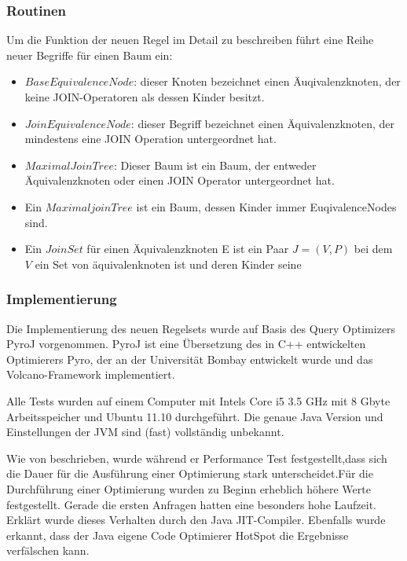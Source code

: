 \subsubsection{Routinen}











Um die Funktion der neuen Regel im Detail zu beschreiben führt \cite{shanbhag2014optimizing} eine Reihe neuer Begriffe für einen Baum ein:

\begin{itemize}
\item $Base Equivalence Node$: dieser Knoten bezeichnet einen Äuqivalenzknoten, der keine JOIN-Operatoren als dessen Kinder besitzt.
\item $Join Equivalence Node$: dieser Begriff bezeichnet einen Äquivalenzknoten, der mindestens eine JOIN Operation untergeordnet hat.
\item $Maximal Join Tree$: Dieser Baum ist ein Baum, der entweder Äquivalenzknoten oder einen JOIN Operator untergeordnet hat.
\item Ein $Maximal join Tree$ ist ein Baum, dessen Kinder immer EuqivalenceNodes sind.
\item Ein $Join Set$ für einen Äquivalenzknoten E ist ein Paar $J = (V, P)$ bei dem $V$ ein Set von äquivalenknoten ist und deren Kinder seine 
\end{itemize}


\subsubsection{Implementierung}
Die Implementierung des neuen Regelsets wurde auf Basis des Query Optimizers PyroJ vorgenommen. PyroJ ist eine Übersetzung des in C++ entwickelten Optimierers Pyro, der an der Universität Bombay entwickelt wurde und das Volcano-Framework implementiert.

Alle Tests wurden auf einem Computer mit Intels Core i5 3.5 GHz mit 8 Gbyte Arbeitsspeicher und Ubuntu 11.10 durchgeführt. Die genaue Java Version und Einstellungen der JVM sind (fast) vollständig unbekannt.

Wie von \cite{shanbhag2014optimizing} beschrieben, wurde während er Performance Test festgestellt,dass sich die Dauer für die Ausführung einer Optimierung stark unterscheidet.Für die Durchführung einer Optimierung wurden zu Beginn erheblich höhere Werte festgestellt. Gerade die ersten Anfragen hatten eine besonders hohe Laufzeit. Erklärt wurde dieses Verhalten durch den Java \ac{JIT}-Compiler. Ebenfalls wurde erkannt, dass der Java eigene Code Optimierer HotSpot die Ergebnisse verfälschen kann. 

